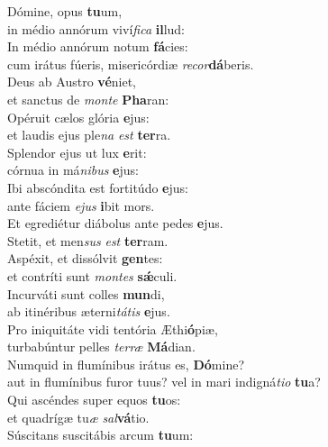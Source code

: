 \evenverse Dómine, opus \textbf{tu}um,~\*\\
\evenverse in médio annórum viví\textit{fi}\textit{ca} \textbf{il}lud:\\
\oddverse In médio annórum notum \textbf{fá}cies:~\*\\
\oddverse cum irátus fúeris, misericórdiæ \textit{re}\textit{cor}\textbf{dá}beris.\\
\evenverse Deus ab Austro \textbf{vé}niet,~\*\\
\evenverse et sanctus de \textit{mon}\textit{te} \textbf{Pha}ran:\\
\oddverse Opéruit cælos glória \textbf{e}jus:~\*\\
\oddverse et laudis ejus ple\textit{na} \textit{est} \textbf{ter}ra.\\
\evenverse Splendor ejus ut lux \textbf{e}rit:~\*\\
\evenverse córnua in má\textit{ni}\textit{bus} \textbf{e}jus:\\
\oddverse Ibi abscóndita est fortitúdo \textbf{e}jus:~\*\\
\oddverse ante fáciem \textit{e}\textit{jus} \textbf{i}bit mors.\\
\evenverse Et egrediétur diábolus ante pedes \textbf{e}jus.~\*\\
\evenverse Stetit, et men\textit{sus} \textit{est} \textbf{ter}ram.\\
\oddverse Aspéxit, et dissólvit \textbf{gen}tes:~\*\\
\oddverse et contríti sunt \textit{mon}\textit{tes} \textbf{sǽ}culi.\\
\evenverse Incurváti sunt colles \textbf{mun}di,~\*\\
\evenverse ab itinéribus æterni\textit{tá}\textit{tis} \textbf{e}jus.\\
\oddverse Pro iniquitáte vidi tentória Æthi\textbf{ó}piæ,~\*\\
\oddverse turbabúntur pelles \textit{ter}\textit{ræ} \textbf{Má}dian.\\
\evenverse Numquid in flumínibus irátus es, \textbf{Dó}mine?~\*\\
\evenverse aut in flumínibus furor tuus? vel in mari indigná\textit{ti}\textit{o} \textbf{tu}a?\\
\oddverse Qui ascéndes super equos \textbf{tu}os:~\*\\
\oddverse et quadrígæ tu\textit{æ} \textit{sal}\textbf{vá}tio.\\
\evenverse Súscitans suscitábis arcum \textbf{tu}um:~\*\\
